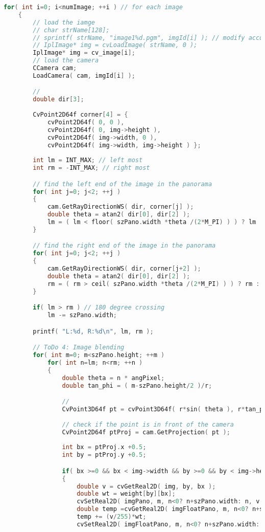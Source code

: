 \documentclass[11pt]{article}
\begin{document}
\begin{lstlisting}[language=C++, caption={ImageBlending}, label=code4]
    for( int i=0; i<numImage; ++i ) // for each image
    {
        // load the iamge
        // char strName[128];
        // sprintf( strName, "image1%d.pgm", imgId[i] ); // modify according to your image name
        // IplImage* img = cvLoadImage( strName, 0 );
        IplImage* img = cv_image[i];
        // load the camera
        CCamera cam;
        LoadCamera( cam, imgId[i] );

        //
        double dir[3];
		
        CvPoint2D64f corner[4] = { 
            cvPoint2D64f( 0, 0 ),
            cvPoint2D64f( 0, img->height ),
            cvPoint2D64f( img->width, 0 ),
            cvPoint2D64f( img->width, img->height ) };
		
        int lm = INT_MAX; // left most
        int rm = -INT_MAX; // right most

        // find the left end of the image in the panorama
        for( int j=0; j<2; ++j )
        {
            cam.GetRayDirectionWS( dir, corner[j] );			
            double theta = atan2( dir[0], dir[2] );
            lm = ( lm < floor( szPano.width *theta /(2*M_PI) ) ) ? lm : floor( szPano.width *theta /(2*M_PI) );
        }

        // find the right end of the image in the panorama
        for( int j=0; j<2; ++j )
        {
            cam.GetRayDirectionWS( dir, corner[j+2] );			
            double theta = atan2( dir[0], dir[2] );
            rm = ( rm > ceil( szPano.width *theta /(2*M_PI) ) ) ? rm : ceil( szPano.width *theta /(2*M_PI) );
        }

        if( lm > rm ) // 180 degree crossing
            lm -= szPano.width;

        printf( "L:%d, R:%d\n", lm, rm );

        // ToDo 4: Image blending
        for( int m=0; m<szPano.height; ++m )
            for( int n=lm; n<rm; ++n )
            {
                double theta = n * angPixel;
                double tan_phi = ( m-szPano.height/2 )/r;

                // 
                CvPoint3D64f pt = cvPoint3D64f( r*sin( theta ), r*tan_phi, r*cos( theta ) );
			
                // check if the point is in front of the camera
                CvPoint2D64f ptProj = cam.GetProjection( pt );
				
                int bx = ptProj.x +0.5;
                int by = ptProj.y +0.5;

                if( bx >=0 && bx < img->width && by >=0 && by < img->height )
                {
                    double v = cvGetReal2D( img, by, bx );
                    double wt = weight[by][bx];
                    cvSetReal2D( imgPano, m, n<0? n+szPano.width: n, v );
                    double temp =cvGetReal2D( imgFloatPano, m, n<0? n+szPano.width: n);
                    temp += (v/255)*wt;
                    cvSetReal2D( imgFloatPano, m, n<0? n+szPano.width: n, temp );


\end{lstlisting}
\end{document}
